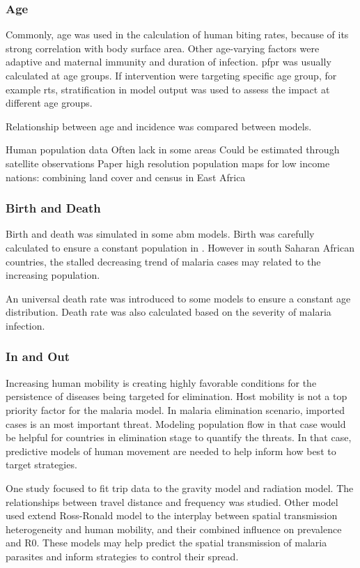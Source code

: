 \documentclass[a4paper, 12pt, twoside]{article}
\begin{document}
\subsubsection{Age}
Commonly, age was used in the calculation of human biting rates, because of its strong correlation with body surface area.
Other age-varying factors were adaptive and maternal immunity and duration of infection.
\gls{pfpr} was usually calculated at age groups.
If intervention were targeting specific age group, for example \gls{rts}, stratification in model output was used to assess the impact at different age groups.

Relationship between age and incidence was compared between models.

Human population data
Often lack in some areas
Could be estimated through satellite observations
Paper high resolution population maps for low income nations: combining land cover and census in East Africa

\subsubsection{Birth and Death}
Birth and death was simulated in some \gls{abm} models.
Birth was carefully calculated to ensure a constant population in .
However in south Saharan African countries, the stalled decreasing trend of malaria cases may related to the increasing population.

An universal death rate was introduced to some models  to ensure a constant age distribution. Death rate was also calculated based on the severity of malaria infection.

\subsubsection{In and Out}
Increasing human mobility is creating highly favorable conditions for the persistence of diseases being targeted for elimination.
Host mobility is not a top priority factor for the malaria model.
In malaria elimination scenario, imported cases is an most important threat.
Modeling population flow in that case would be helpful for countries in elimination stage to quantify the threats.
In that case, predictive models of human movement are needed to help inform how best to target strategies.

One study focused to fit trip data to the gravity model and radiation model\cite{Marshall2018}.
The relationships between travel distance and frequency was studied.
Other model\cite{acevedo_spatial_2015} used extend Ross-Ronald model to the interplay between spatial transmission heterogeneity and human mobility, and their combined influence on prevalence and \gls{R0}.
These models may help predict the spatial transmission of malaria parasites and inform strategies to control their spread.
\end{document}
